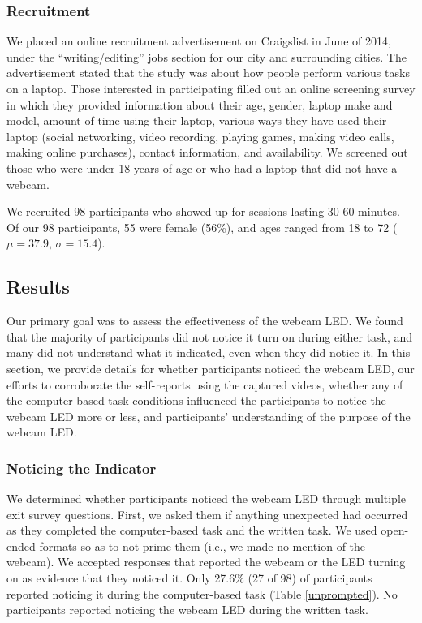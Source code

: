\documentclass{sigchi}
\begin{document}

\subsubsection{Recruitment}
We placed an online recruitment advertisement on Craigslist in June of 2014, under the ``writing/editing'' jobs section for our city and surrounding cities. The advertisement stated that the study was about how people perform various tasks on a laptop. Those interested in participating filled out an online screening survey in which they provided information about their age, gender, laptop make and model, amount of time using their laptop, various ways they have used their laptop (social networking, video recording, playing games, making video calls, making online purchases), contact information, and availability. We screened out those who were under 18 years of age or who had a laptop that did not have a webcam.

We recruited 98 participants who showed up for sessions lasting 30-60 minutes. Of our 98 participants, 55 were female (56\%), and ages ranged from 18 to 72 ($\mu = 37.9$, $\sigma = 15.4$).

\subsection{Results}
Our primary goal was to assess the effectiveness of the webcam LED. We found that the majority of participants did not notice it turn on during either task, and many did not understand what it indicated, even when they did notice it. In this section, we provide details for whether participants noticed the webcam LED, our efforts to corroborate the self-reports using the captured videos, whether any of the computer-based task conditions influenced the participants to notice the webcam LED more or less, and participants' understanding of the purpose of the webcam LED.

\subsubsection{Noticing the Indicator}
We determined whether participants noticed the webcam LED through multiple exit survey questions. First, we asked them if anything unexpected had occurred as they completed the computer-based task and the written task. We used open-ended formats so as to not prime them (i.e., we made no mention of the webcam). We accepted responses that reported the webcam or the LED turning on as evidence that they noticed it. Only 27.6\% (27 of 98) of participants reported noticing it during the computer-based task (Table \ref{unprompted}). No participants reported noticing the webcam LED during the written task.
\end{document}
